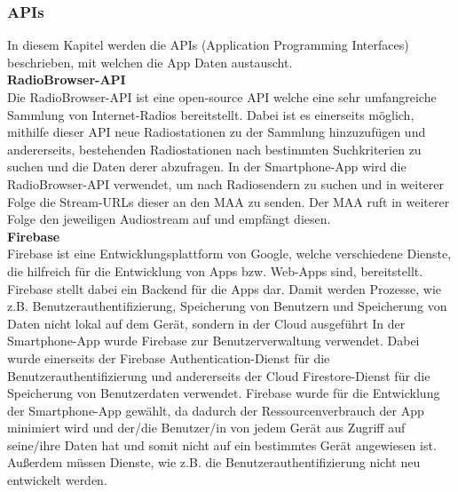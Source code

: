 \documentclass[11pt, twoside]{article}
\begin{document}
\subsubsection{APIs}
In diesem Kapitel werden die APIs (Application Programming Interfaces) beschrieben, mit welchen die App Daten austauscht. \newline \\
\textbf{RadioBrowser-API}\\
Die RadioBrowser-API ist eine open-source API welche eine sehr umfangreiche Sammlung von Internet-Radios bereitstellt. Dabei ist es einerseits möglich, mithilfe dieser API neue Radiostationen zu der Sammlung hinzuzufügen und andererseits, bestehenden Radiostationen nach bestimmten Suchkriterien zu suchen und die Daten derer abzufragen. \parencite[vgl.][]{noauthor_urlpi21_nodate} In der Smartphone-App wird die RadioBrowser-API verwendet, um nach Radiosendern zu suchen und in weiterer Folge die Stream-URLs dieser an den MAA zu senden. Der MAA ruft in weiterer Folge den jeweiligen Audiostream auf und empfängt diesen. \newline \\
\textbf{Firebase}\\
Firebase ist eine Entwicklungsplattform von Google, welche verschiedene Dienste, die hilfreich für die Entwicklung von Apps bzw. Web-Apps sind, bereitstellt. Firebase stellt dabei ein Backend für die Apps dar. Damit werden Prozesse, wie z.B. Benutzerauthentifizierung, Speicherung von Benutzern und Speicherung von Daten nicht lokal auf dem Gerät, sondern in der Cloud ausgeführt \parencite[vgl.][]{noauthor_urlpi22_nodate} In der Smartphone-App wurde Firebase zur Benutzerverwaltung verwendet. Dabei wurde einerseits der \glqq Firebase Authentication\grqq{}-Dienst für die Benutzerauthentifizierung und andererseits der \glqq Cloud Firestore\grqq{}-Dienst für die Speicherung von Benutzerdaten verwendet. Firebase wurde für die Entwicklung der Smartphone-App gewählt, da dadurch der Ressourcenverbrauch der App minimiert wird und der/die Benutzer/in von jedem Gerät aus Zugriff auf seine/ihre Daten hat und somit nicht auf ein bestimmtes Gerät angewiesen ist. Außerdem müssen Dienste, wie z.B. die Benutzerauthentifizierung nicht neu entwickelt werden.
\end{document}
